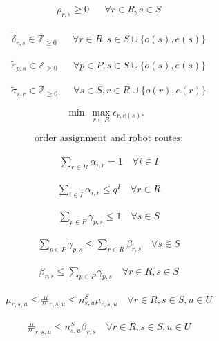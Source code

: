 \documentclass[10pt]{article}
\begin{document}
\[\begin{aligned}&\rho_{r, s} \ge 0 && \forall r \in R, s \in S\end{aligned}\]

\[\begin{aligned}&\tilde{\delta}_{r, s} \in \mathbb{Z}_{\ge0} && \forall r \in R, s \in S \cup \{o(s), e(s)\}\end{aligned}\]

\[\begin{aligned}&\tilde{\varepsilon}_{p, s} \in \mathbb{Z}_{\ge0} && \forall p \in P, s \in S \cup \{o(s), e(s)\}\end{aligned}\]

\[\begin{aligned}&\tilde{\sigma}_{s, r} \in \mathbb{Z}_{\ge0} && \forall s \in S, r \in R \cup \{o(r), e(r)\}\end{aligned}\]

\[\min\ \max_{r\in R}\epsilon_{r,e(s)}.\tag{4.1}\]

\[\begin{aligned}&\text{order assignment and robot routes:}\end{aligned}\]

\[\begin{aligned}& \sum_{r \in R} \alpha_{i, r} = 1 \quad \forall i \in I\end{aligned}\]

\[\begin{aligned}& \sum_{i \in I} \alpha_{i, r} \le q^I \quad \forall r \in R\end{aligned}\]

\[\begin{aligned}& \sum_{p \in P} \gamma_{p, s} \le 1 \quad \forall s \in S\end{aligned}\]

\[\begin{aligned}& \sum_{p \in P} \gamma_{p, s} \le \sum_{r \in R} \beta_{r, s} \quad \forall s \in S\end{aligned}\]

\[\begin{aligned}& \beta_{r, s} \le \sum_{p \in P} \gamma_{p, s} \quad \forall r \in R, s \in S\end{aligned}\]

\[\begin{aligned}& \mu_{r, s, u} \le \#_{r, s, u} \le n^S_{s, u} \mu_{r, s, u} \quad \forall r \in R, s \in S, u \in U\end{aligned}\]

\[\begin{aligned}& \#_{r, s, u} \le n^S_{s, u} \beta_{r, s} \quad \forall r \in R, s \in S, u \in U\end{aligned}\]
\end{document}
